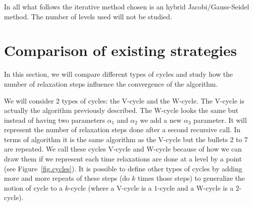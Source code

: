 \documentclass[a4paper,10pt]{article}
\begin{document}
  In all what follows the iterative method chosen is an hybrid Jacobi/Gauss-Seidel method. The number of levels used will not be studied.
  
\section{Comparison of existing strategies}

  In this section, we will compare different types of cycles and study how the number of relaxation steps influence the convergence of the algorithm.
  
  We will consider 2 types of cycles: the V-cycle and the W-cycle. The V-cycle is actually the algorithm previously described. The W-cycle looks the same but instead of having two parameters
  $\alpha_1$ and $\alpha_2$ we add a new $\alpha_3$ parameter. It will represent the number of relaxation steps done after a second recursive call. In terms of algorithm it is the same
  algorithm as the V-cycle but the bullets 2 to 7 are repeated. We call these cycles V-cycle and W-cycle because of how we can draw them if we represent each time relaxations are done
  at a level by a point (see Figure~\ref{fig.cycles}). It is possible to define other types of cycles by adding more and more repeats of these steps (do $k$ times those steps) to generalize
  the notion of cycle to a $k$-cycle (where a V-cycle is a $1$-cycle and a W-cycle is a $2$-cycle).
  
\end{document}

